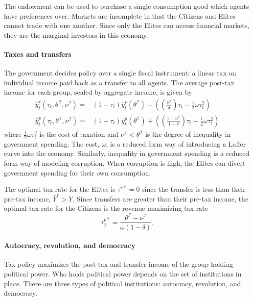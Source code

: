The endowment can be used to purchase a single consumption good which agents have \cite{Epstein1989} preferences over. Markets are incomplete in that the Citizens and Elites cannot trade with one another. Since only the Elites can access financial markets, they are the marginal investors in this economy.

\paragraph{Taxes and transfers}
The government decides policy over a single fiscal instrument: a linear tax on individual income paid back as a transfer to all agents. The average post-tax income for each group, scaled by aggregate income, is given by
\begin{align}
\hat{y}_{t}^{r} (\tau_{t},\theta^{\mathcal{I}},\nu^{\mathcal{I}}) = & (1-\tau_{t})\bar{y}_{t}^{r}(\theta^{\mathcal{I}})+\left(\left(\frac{\nu^{\mathcal{I}}}{\delta}\right)\tau_{t}-\frac{1}{2}\omega\tau_t^2\right) \\
\hat{y}_{t}^{p} (\tau_{t},\theta^{\mathcal{I}},\nu^{\mathcal{I}}) = & (1-\tau_{t})\bar{y}_{t}^{p}(\theta^{\mathcal{I}})+\left(\left(\frac{1-\nu^{\mathcal{I}}}{1-\delta}\right)\tau_{t}-\frac{1}{2}\omega\tau_t^2\right)
\end{align}
where $\frac{1}{2}\omega\tau_t^2$ is the cost of taxation and $\nu^{\mathcal{I}}<\theta^{\mathcal{I}}$ is the degree of inequality in government spending. The cost, $\omega$, is a reduced form way of introducing a Laffer curve into the economy. Similarly, inequality in government spending is a reduced form way of modeling corruption. When corruption is high, the Elites can divert government spending for their own consumption.

The optimal tax rate for the Elites is $\tau^{r*} = 0$ since the transfer is less than their pre-tax income, $\bar{Y}^{r}>Y$. Since transfers are greater than their pre-tax income, the optimal tax rate for the Citizens is the revenue maximizing tax rate
\begin{equation}
\tau^{p*}_\mathcal{I}=\frac{\theta^{\mathcal{I}}-\nu^{\mathcal{I}}}{\omega(1-\delta)}.
\end{equation}

\paragraph{Autocracy, revolution, and democracy}
Tax policy maximizes the post-tax and transfer income of the group holding political power. Who holds political power depends on the set of institutions in place. There are three types of political institutions: autocracy, revolution, and democracy. 

